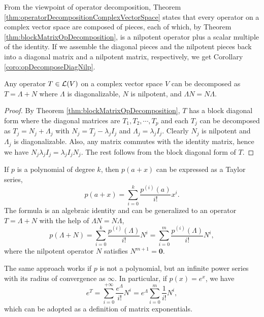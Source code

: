 \begin{rem}
  From the viewpoint of operator decomposition, 
  Theorem \ref{thm:operatorDecompositionComplexVectorSpace}
  states that every operator on a complex vector space
  are composed of pieces,
  each of which,
  by Theorem \ref{thm:blockMatrixOpDecomposition}, 
  is a nilpotent operator plus
  a scalar multiple of the identity.
  If we assemble the diagonal pieces
  and the nilpotent pieces back into
  a diagonal matrix and a nilpotent matrix, respectively,
  we get Corollary \ref{coro:opDecomposeDiagNilp}.  
\end{rem}

\begin{coro}
  \label{coro:opDecomposeDiagNilp}
  Any operator $T\in {\cal L}(V)$
  on a complex vector space $V$
  can be decomposed as $T=\Lambda+N$
  where $\Lambda$ is diagonalizable,
  $N$ is nilpotent, and $\Lambda N=N\Lambda$.  
\end{coro}
\begin{proof}
  By Theorem \ref{thm:blockMatrixOpDecomposition},
  $T$ has a block diagonal form
  where the diagonal matrices are
  $T_1, T_2, \cdots, T_p$
  and each $T_j$ can be decomposed as
  $T_j=N_j + \Lambda_j$
  with $N_j=T_j-\lambda_jI_j$
  and $\Lambda_j=\lambda_jI_j$.
  Clearly $N_j$ is nilpotent and $\Lambda_j$ is diagonalizable.
  Also, any matrix commutes with the identity matrix,
  hence we have $N_j \lambda_jI_j = \lambda_jI_j N_j$.
  The rest follows from the block diagonal form of $T$.
\end{proof}

\begin{exm}
  \label{exm:operatorDecompositionExp}
  If $p$ is a polynomial of degree $k$,
  then $p(a+x)$ can be expressed as a Taylor series, 
  \begin{displaymath}
    p(a+x) = \sum_{i=0}^k \frac{p^{(i)}(a)}{i!}x^i.
  \end{displaymath}
  The formula is an algebraic identity
  and can be generalized to an operator
  $T=\Lambda+N$ with the help of $\Lambda N=N\Lambda$,
  \begin{displaymath}
    p(\Lambda+N) = \sum_{i=0}^k \frac{p^{(i)}(\Lambda)}{i!}N^i
    = \sum_{i=0}^{m} \frac{p^{(i)}(\Lambda)}{i!}N^i,
  \end{displaymath}
  where the nilpotent operator $N$ satisfies $N^{m+1}=\mathbf{0}$.

  The same approach works if $p$ is not a polynomial, 
  but an infinite power series with its radius of convergence
  as $\infty$.
  In particular, if $p(x)=e^x$,
  we have
  \begin{equation}
    \label{eq:matrixExponentialFromDecomp}
    e^T = \sum_{i=0}^{+\infty} \frac{e^{\Lambda}}{i!}N^i
    = e^{\Lambda}\sum_{i=0}^m \frac{1}{i!}N^i,
  \end{equation}
  which can be adopted as a definition of matrix exponentials.
\end{exm}


